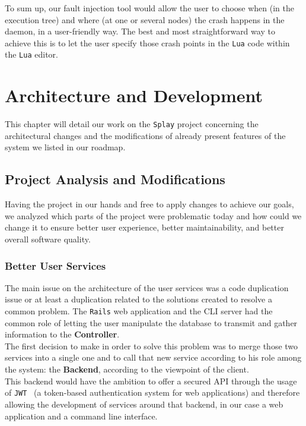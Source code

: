 \documentclass{eplmastersthesis}
\begin{document}
          To sum up, our fault injection tool would allow the user to choose
          when (in the execution tree) and where (at one or several nodes) the
          crash happens in the daemon, in a user-friendly way. The best and
          most straightforward way to achieve this is to let
          the user specify those crash points in the \texttt{Lua} code within the \texttt{Lua}
          editor.

  \chapter{Architecture and Development}
  \label{chap:dev}

    This chapter will detail our work on the \texttt{Splay} project concerning the
    architectural changes and the modifications of already present features
    of the system we listed in our roadmap.

    \section{Project Analysis and Modifications}

      Having the project in our hands and free to apply changes to achieve our
      goals, we analyzed which parts of the project were problematic today and
      how could we change it to ensure better user experience, better
      maintainability, and better overall software quality.

      \subsection{Better User Services}

        The main issue on the architecture of the user services was a code
        duplication issue or at least a duplication related to the solutions
        created to resolve a common problem. The \texttt{Rails} web application and the
        CLI server had the common role of letting the user manipulate the
        database to transmit and gather information to the \textbf{Controller}.\\

        The first decision to make in order to solve this problem was to
        merge those two services into a single one and to call that new
        service according to his role among the system: the \textbf{Backend},
        according to the viewpoint of the client.\\
        This backend would have the ambition to offer a secured API through
        the usage of \texttt{JWT}~\cite{JWT} (a token-based authentication system
        for web applications) and therefore allowing the development
        of services around that backend, in our case a web application and
        a command line interface.\\
\end{document}
